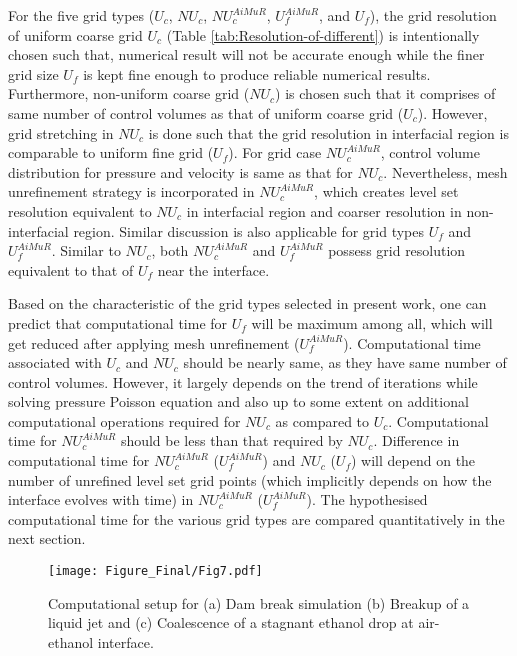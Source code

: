 \documentclass[preprint,12pt]{elsarticle}
\begin{document}
For the five grid types  ($U_{c}$, $NU_{c}$, $NU_{c}^{AiMuR}$, $U_{f}^{AiMuR}$, and $U_{f}$), the grid resolution of uniform coarse grid $U_{c}$ (Table \ref{tab:Resolution-of-different}) is intentionally
chosen such that, numerical result will not be accurate enough while the finer grid size $U_{f}$ is kept fine enough to produce reliable numerical results. Furthermore, non-uniform
coarse grid ($NU_{c}$) is chosen such that it comprises of same number of control volumes
as that of uniform coarse grid ($U_{c}$). However, grid stretching
in $NU_{c}$ is done such that the grid resolution in interfacial region is comparable to uniform fine grid  ($U_{f}$).  For grid case $NU_{c}^{AiMuR}$, control
volume distribution for pressure and velocity is same as that for
$NU_{c}$. Nevertheless, mesh unrefinement strategy is incorporated
in $NU_{c}^{AiMuR}$, which creates level set resolution equivalent
to $NU_{c}$ in interfacial region and coarser resolution in non-interfacial
region. Similar discussion is also applicable for grid types $U_{f}$ and $U_{f}^{AiMuR}$. Similar to $NU_{c}$, both $NU_{c}^{AiMuR}$
and $U_{f}^{AiMuR}$ possess grid resolution equivalent to that of $U_{f}$ near the interface.

Based on the characteristic of the grid types selected in present
work, one can predict that computational time for $U_{f}$ will be
maximum among all, which will get reduced after applying mesh unrefinement
($U_{f}^{AiMuR}$). Computational time associated with $U_{c}$ and
$NU_{c}$ should be nearly same, as they have same number of control volumes.
However, it  largely depends on the trend of iterations while solving
pressure Poisson equation and also up to some extent on additional
computational operations required for $NU_{c}$ as compared to $U_{c}$. Computational time
for $NU_{c}^{AiMuR}$ should be  less than that required by $NU_{c}$.
Difference in computational time for $NU_{c}^{AiMuR}$
($U_{f}^{AiMuR}$) and $NU_{c}$ ($U_{f}$) will depend on the number
of unrefined level set grid points (which implicitly depends on how the interface evolves with time) in $NU_{c}^{AiMuR}$ ($U_{f}^{AiMuR}$). The hypothesised computational time for the various grid types are compared quantitatively in the next section.

\begin{figure}
\begin{centering}
\texttt{[image: Figure\_Final/Fig7.pdf]}
\par\end{centering}

\protect\caption{\label{fig:Computational-setup-for-3}Computational setup for (a)
Dam break simulation (b) Breakup of a liquid jet and (c) Coalescence
of a stagnant ethanol drop at air-ethanol interface.}
\end{figure}
\end{document}
